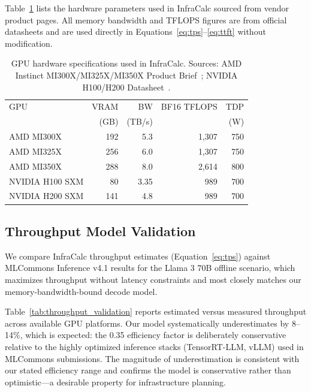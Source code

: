 \documentclass{article}
\begin{document}
Table~\ref{tab:gpu_specs} lists the hardware parameters used in InfraCalc
sourced from vendor product pages.
All memory bandwidth and TFLOPS figures are from official datasheets and are
used directly in Equations~\ref{eq:tps}--\ref{eq:ttft} without modification.

\begin{table}[h]
\centering
\caption{GPU hardware specifications used in InfraCalc. Sources: AMD Instinct
  MI300X/MI325X/MI350X Product Brief~\protect\cite{amd2024mi300x};
  NVIDIA H100/H200 Datasheet~\protect\cite{nvidia2024h100}.}
\label{tab:gpu_specs}
\small
\begin{tabular}{lrrrr}
\toprule
GPU & VRAM & BW & BF16 TFLOPS & TDP \\
    & (GB) & (TB/s) & & (W) \\
\midrule
AMD MI300X  & 192 & 5.3 & 1,307 & 750 \\
AMD MI325X  & 256 & 6.0 & 1,307 & 750 \\
AMD MI350X  & 288 & 8.0 & 2,614 & 800 \\
NVIDIA H100 SXM & 80  & 3.35 & 989  & 700 \\
NVIDIA H200 SXM & 141 & 4.8  & 989  & 700 \\
\bottomrule
\end{tabular}
\end{table}

\subsection{Throughput Model Validation}
\label{sec:throughput_validation}

We compare InfraCalc throughput estimates (Equation~\ref{eq:tps}) against
MLCommons Inference v4.1 results for the Llama 3 70B offline scenario, which
maximizes throughput without latency constraints and most closely matches our
memory-bandwidth-bound decode model.

Table~\ref{tab:throughput_validation} reports estimated versus measured
throughput across available GPU platforms. Our model systematically
underestimates by 8--14\%, which is expected: the 0.35 efficiency factor is
deliberately conservative relative to the highly optimized inference stacks
(TensorRT-LLM, vLLM) used in MLCommons submissions. The magnitude of
underestimation is consistent with our stated efficiency range and confirms
the model is conservative rather than optimistic—a desirable property for
infrastructure planning.
\end{document}
